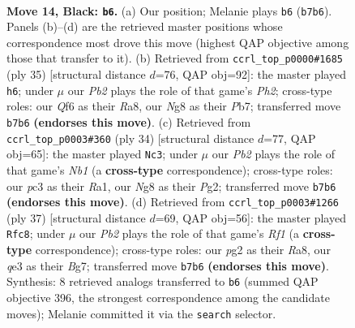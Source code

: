 \documentclass[11pt]{article}
\begin{document}
\clearpage

\begin{figure}[p]\centering
\begin{subfigure}{0.46\textwidth}\centering
\resizebox{\linewidth}{!}{%
\newchessgame
\chessboard[
  setfen={2kr2nr/ppp2ppp/2p2q2/3b4/8/2P1QP2/PP4PP/R3KB1R b KQ - 0 14},
  showmover=false,
  pgfstyle=straightmove, color=movearrow, markmove={b7-b6}
]}
\caption{}
\end{subfigure}\hfill
\begin{subfigure}{0.46\textwidth}\centering
\resizebox{\linewidth}{!}{%
\newchessgame
\chessboard[
  setfen={r4rk1/1p3ppp/1pnp1q2/8/2P1b3/7P/PP1QBPPN/R3R1K1 b - - 1 18},
  showmover=false,
  pgfstyle=straightmove, color=movearrow, markmove={h7-h6}
]}
\caption{}
\end{subfigure}
\\[4pt]
\begin{subfigure}{0.46\textwidth}\centering
\resizebox{\linewidth}{!}{%
\newchessgame
\chessboard[
  setfen={r1b2k1r/pp3pp1/2pb1q2/7p/2B1pP2/PP2P3/2QP2PP/RN3RK1 w - - 0 18},
  showmover=false,
  pgfstyle=straightmove, color=movearrow, markmove={b1-c3}
]}
\caption{}
\end{subfigure}\hfill
\begin{subfigure}{0.46\textwidth}\centering
\resizebox{\linewidth}{!}{%
\newchessgame
\chessboard[
  setfen={r4rk1/4ppbp/2p3p1/p4q2/Q7/2P4P/PP3PP1/R1BR2K1 b - - 0 19},
  showmover=false,
  pgfstyle=straightmove, color=movearrow, markmove={f8-c8}
]}
\caption{}
\end{subfigure}
\caption{\textbf{Move 14, Black: \texttt{b6}.} (a) Our position; Melanie plays \texttt{b6} (\texttt{b7b6}). Panels (b)--(d) are the retrieved master positions whose correspondence most drove this move (highest QAP objective among those that transfer to it). (b) Retrieved from \texttt{ccrl\_top\_p0000\#1685} (ply 35) [structural distance $d$=76, QAP obj=92]: the master played \texttt{h6}; under $\mu$ our \emph{Pb2} plays the role of that game's \emph{Ph2}; cross-type roles: our \emph{Q}f6 as their \emph{R}a8, our \emph{N}g8 as their \emph{P}b7; transferred move \texttt{b7b6} \textbf{(endorses this move)}. (c) Retrieved from \texttt{ccrl\_top\_p0003\#360} (ply 34) [structural distance $d$=77, QAP obj=65]: the master played \texttt{Nc3}; under $\mu$ our \emph{Pb2} plays the role of that game's \emph{Nb1} (a \textbf{cross-type} correspondence); cross-type roles: our \emph{p}c3 as their \emph{R}a1, our \emph{N}g8 as their \emph{P}g2; transferred move \texttt{b7b6} \textbf{(endorses this move)}. (d) Retrieved from \texttt{ccrl\_top\_p0003\#1266} (ply 37) [structural distance $d$=69, QAP obj=56]: the master played \texttt{Rfc8}; under $\mu$ our \emph{Pb2} plays the role of that game's \emph{Rf1} (a \textbf{cross-type} correspondence); cross-type roles: our \emph{p}g2 as their \emph{R}a8, our \emph{q}e3 as their \emph{B}g7; transferred move \texttt{b7b6} \textbf{(endorses this move)}. Synthesis: 8 retrieved analogs transferred to \texttt{b6} (summed QAP objective 396, the strongest correspondence among the candidate moves); Melanie committed it via the \texttt{search} selector.}
\label{fig:thought-m27}
\end{figure}
\end{document}
